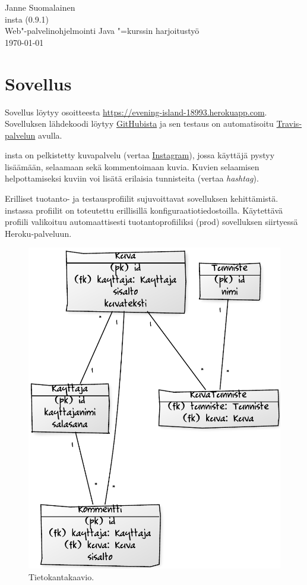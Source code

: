 \documentclass[finnish,colorlinks,headings=normal,parskip=half,footsepline]{scrartcl}
\begin{document}
Janne Suomalainen\\\textsf{insta} (0.9.1)\\Web"-palvelinohjelmointi Java "=kurssin harjoitustyö\\\today

\section{Sovellus}
Sovellus löytyy osoitteesta \url{https://evening-island-18993.herokuapp.com}. Sovelluksen lähdekoodi löytyy \href{https://github.com/suomja1/insta}{GitHubista} ja sen testaus on automatisoitu \href{https://travis-ci.org/suomja1/insta}{Travis-palvelun} avulla.

\textsf{insta} on pelkistetty kuvapalvelu (vertaa \href{https://www.instagram.com}{Instagram}), jossa käyttäjä pystyy lisäämään, selaamaan sekä kommentoimaan kuvia. Kuvien selaamisen helpottamiseksi kuviin voi lisätä erilaisia tunnisteita (vertaa \emph{hashtag}).

Erilliset tuotanto- ja testausprofiilit sujuvoittavat sovelluksen kehittämistä. \textsf{insta}ssa profiilit on toteutettu erillisillä konfiguraatiotiedostoilla. Käytettävä profiili valikoituu automaattisesti tuotantoprofiiliksi (prod) sovelluksen siirtyessä Heroku-palveluun.

\begin{figure}
\vspace*{-\intextsep}
\centering\includegraphics[width=\linewidth]{6424b8c7}
\caption{Tietokantakaavio.}\label{fig:tk}
\end{figure}
\end{document}
